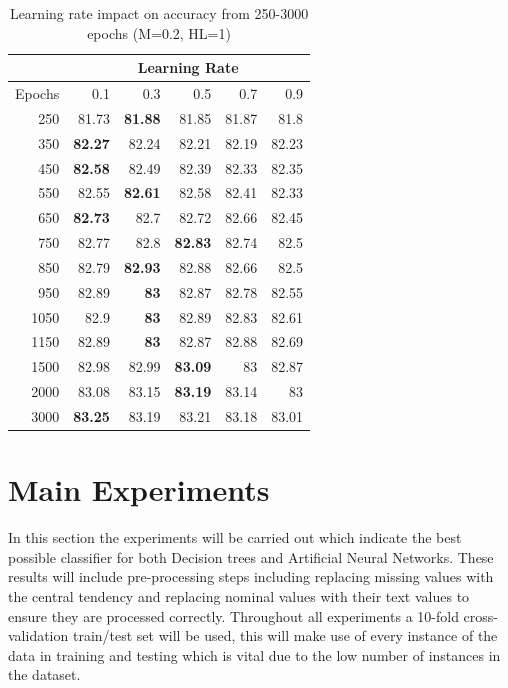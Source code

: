 \documentclass[12pt]{article}
\begin{document}
      \begin{table}[H]
        \centering
        \caption{Learning rate impact on accuracy from 250-3000 epochs (M=0.2, HL=1)}
          \begin{tabular}{r|rrrrr}
          \toprule
                & \multicolumn{5}{c}{Learning Rate} \\
          \midrule
          \multicolumn{1}{l|}{Epochs} & 0.1   & 0.3   & 0.5   & 0.7   & 0.9 \\
          \midrule
          250   & 81.73 & \textbf{81.88} & 81.85 & 81.87 & 81.8 \\
          350   & \textbf{82.27} & 82.24 & 82.21 & 82.19 & 82.23 \\
          450   & \textbf{82.58} & 82.49 & 82.39 & 82.33 & 82.35 \\
          550   & 82.55 & \textbf{82.61} & 82.58 & 82.41 & 82.33 \\
          650   & \textbf{82.73} & 82.7  & 82.72 & 82.66 & 82.45 \\
          750   & 82.77 & 82.8  & \textbf{82.83} & 82.74 & 82.5 \\
          850   & 82.79 & \textbf{82.93} & 82.88 & 82.66 & 82.5 \\
          950   & 82.89 & \textbf{83} & 82.87 & 82.78 & 82.55 \\
          1050  & 82.9  & \textbf{83} & 82.89 & 82.83 & 82.61 \\
          1150  & 82.89 & \textbf{83} & 82.87 & 82.88 & 82.69 \\
          1500  & 82.98 & 82.99 & \textbf{83.09} & 83    & 82.87 \\
          2000  & 83.08 & 83.15 & \textbf{83.19} & 83.14 & 83 \\
          3000  & \textbf{83.25} & 83.19 & 83.21 & 83.18 & 83.01 \\
          \bottomrule
          \end{tabular}%
        \label{tab:addlabel}%
      \end{table}%

\newpage
\section{Main Experiments}
  In this section the experiments will be carried out which indicate the best possible classifier for both Decision trees and Artificial Neural Networks. These results will include pre-processing steps including replacing missing values with the central tendency and replacing nominal values with their text values to ensure they are processed correctly. Throughout all experiments a 10-fold cross-validation train/test set will be used, this will make use of every instance of the data in training and testing which is vital due to the low number of instances in the dataset.
\end{document}
